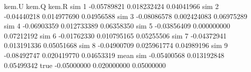 \begin{Schunk}
\begin{Soutput}
               kem.U       kem.Q      kem.R
sim 1    -0.05789821 0.018232424 0.04041966
sim 2    -0.04440218 0.014977690 0.04956588
sim 3    -0.08086578 0.002424083 0.06975289
sim 4    -0.06903359 0.012733389 0.06358350
sim 5    -0.03856409 0.000000000 0.07212192
sim 6    -0.01762330 0.010795165 0.05255506
sim 7    -0.04372941 0.013191336 0.05051668
sim 8    -0.04900709 0.025961774 0.04989196
sim 9    -0.08492747 0.020419770 0.04653319
mean sim -0.05400568 0.013192848 0.05499342
true     -0.05000000 0.020000000 0.05000000
\end{Soutput}
\end{Schunk}
